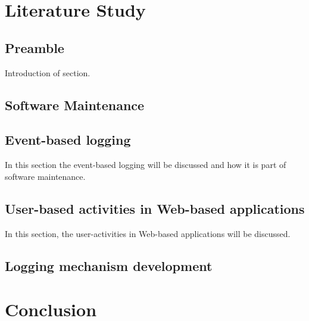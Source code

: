 \newpage
\section{Literature Study}

\subsection{Preamble}
Introduction of section.

\subsection{Software Maintenance}

\subsection{Event-based logging}
In this section the event-based logging will be discussed and how it is part of software maintenance. 

\subsection{User-based activities in Web-based applications}
In this section, the user-activities in Web-based applications will be discussed.

\subsection{Logging mechanism development}

\section{Conclusion}

